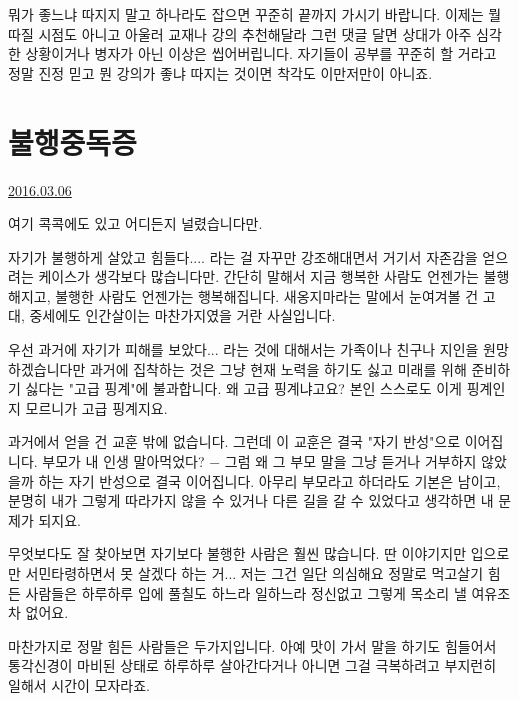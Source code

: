 뭐가 좋느냐 따지지 말고 하나라도 잡으면 꾸준히 끝까지 가시기 바랍니다.
이제는 뭘 따질 시점도 아니고 아울러 교재나 강의 추천해달라 그런 댓글 달면 상대가 아주 심각한 상황이거나 병자가 아닌 이상은 씹어버립니다.
자기들이 공부를 꾸준히 할 거라고 정말 진정 믿고 뭔 강의가 좋냐 따지는 것이면 착각도 이만저만이 아니죠.
\vspace{5mm}





\section{불행중독증}
\href{https://www.kockoc.com/Apoc/665182}{2016.03.06}

\vspace{5mm}

여기 콕콕에도 있고 어디든지 널렸습니다만.
\vspace{5mm}

자기가 불행하게 살았고 힘들다.... 라는 걸 자꾸만 강조해대면서 거기서 자존감을 얻으려는 케이스가 생각보다 많습니다만.
간단히 말해서 지금 행복한 사람도 언젠가는 불행해지고, 불행한 사람도 언젠가는 행복해집니다.
새옹지마라는 말에서 눈여겨볼 건 고대, 중세에도 인간살이는 마찬가지였을 거란 사실입니다.
\vspace{5mm}

우선 과거에 자기가 피해를 보았다... 라는 것에 대해서는 가족이나 친구나 지인을 원망하겠습니다만
과거에 집착하는 것은 그냥 현재 노력을 하기도 싫고 미래를 위해 준비하기 싫다는 "고급 핑계"에 불과합니다.
왜 고급 핑계냐고요? 본인 스스로도 이게 핑계인지 모르니가 고급 핑계지요.
\vspace{5mm}

과거에서 얻을 건 교훈 밖에 없습니다. 그런데 이 교훈은 결국 "자기 반성"으로 이어집니다.
부모가 내 인생 말아먹었다? $-$ 그럼 왜 그 부모 말을 그냥 듣거나 거부하지 않았을까 하는 자기 반성으로 결국 이어집니다.
아무리 부모라고 하더라도 기본은 남이고,
분명히 내가 그렇게 따라가지 않을 수 있거나 다른 길을 갈 수 있었다고 생각하면 내 문제가 되지요.
\vspace{5mm}

무엇보다도 잘 찾아보면 자기보다 불행한 사람은 훨씬 많습니다.
딴 이야기지만 입으로만 서민타령하면서 못 살겠다 하는 거... 저는 그건 일단 의심해요
정말로 먹고살기 힘든 사람들은 하루하루 입에 풀칠도 하느라 일하느라 정신없고 그렇게 목소리 낼 여유조차 없어요.
\vspace{5mm}

마찬가지로 정말 힘든 사람들은 두가지입니다.
아예 맛이 가서 말을 하기도 힘들어서 통각신경이 마비된 상태로 하루하루 살아간다거나
아니면 그걸 극복하려고 부지런히 일해서 시간이 모자라죠.
\vspace{5mm}

